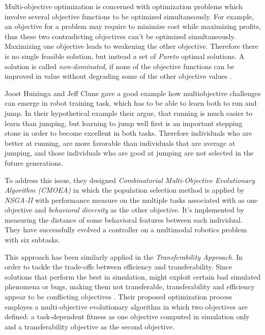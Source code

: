 Multi-objective optimization is concerned with optimization problems which involve several objective functions to be optimized simultaneously. For example, an objective for a problem may require to minimize cost while maximizing profits, thus these two contradicting objectives can't be optimized simultaneously. Maximizing one objective leads to weakening the other objective. Therefore there is no single feasible solution, but instead a set of \emph{Pareto} optimal solutions.  A solution is called \emph{non-dominated}, if none of the objective functions can be improved in value without degrading some of the other objective values \citep{deb2014multi}.

Joost Huizinga and Jeff Clune gave a good example \citep{Huizinga2018EvolvingMR} how multiobjective challenges can emerge in robot training task, which has to be able to learn both to run and jump. In their hypothetical example their argue, that running is much easier to learn than jumping, but learning to jump well first is an important stepping stone in order to become excellent in both tasks. Therefore individuals who are better at running, are more favorable than individuals that are average at jumping, and those individuals who are good at jumping are not selected in the future generations.

To address this issue, they designed \emph{Combinatorial Multi-Objective Evolutionary Algorithm (CMOEA)} in which the population selection method is applied by \emph{NSGA-II} with performance measure on the multiple tasks associated with as one objective and \emph{behavioral diversity} \citep{behavioraldiversity} as the other objective. It's implemented by measuring the distance of some behavioral features between each individual. They have successfully evolved a controller on a multimodal robotics problem with six subtasks.

This approach has been similarly applied in the \emph{Transferability Approach}. In order to tackle the trade-offs between efficiency and transferability. Since solutions that perform the best in simulation, might exploit certain bad simulated phenomena or bugs, making them not transferable, transferability and efficiency appear to be conflicting objectives \citep{koos2012transferability}. Their proposed optimization process employes a multi-objective evolutionary algorithm in which two objectives are defined: a task-dependent fitness as one objective computed in simulation only and a transferability objective as the second objective. 

